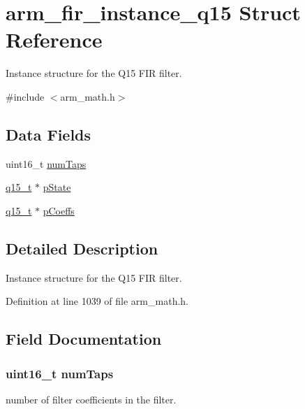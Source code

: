 \hypertarget{structarm__fir__instance__q15}{}\section{arm\+\_\+fir\+\_\+instance\+\_\+q15 Struct Reference}
\label{structarm__fir__instance__q15}


Instance structure for the Q15 F\+IR filter.  




{\ttfamily \#include $<$arm\+\_\+math.\+h$>$}

\subsection*{Data Fields}
\begin{DoxyCompactItemize}
\item 
uint16\+\_\+t \hyperlink{structarm__fir__instance__q15_a751941891e47f522a7f5375fe8990aac}{num\+Taps}
\item 
\hyperlink{arm__math_8h_ab5a8fb21a5b3b983d5f54f31614052ea}{q15\+\_\+t} $\ast$ \hyperlink{structarm__fir__instance__q15_ae29dfdb736374fcddaeaec4b7770170c}{p\+State}
\item 
\hyperlink{arm__math_8h_ab5a8fb21a5b3b983d5f54f31614052ea}{q15\+\_\+t} $\ast$ \hyperlink{structarm__fir__instance__q15_a7ca181a37f714d174445f486bebce26f}{p\+Coeffs}
\end{DoxyCompactItemize}


\subsection{Detailed Description}
Instance structure for the Q15 F\+IR filter. 

Definition at line 1039 of file arm\+\_\+math.\+h.



\subsection{Field Documentation}
\subsubsection[{\texorpdfstring{num\+Taps}{numTaps}}]{\setlength{\rightskip}{0pt plus 5cm}uint16\+\_\+t num\+Taps}\hypertarget{structarm__fir__instance__q15_a751941891e47f522a7f5375fe8990aac}{}\label{structarm__fir__instance__q15_a751941891e47f522a7f5375fe8990aac}
number of filter coefficients in the filter. 


